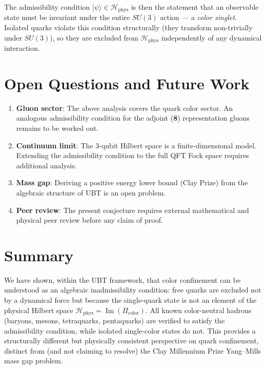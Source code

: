 \documentclass[12pt,a4paper]{article}
\newcommand{\Hphys}{\mathcal{H}_{\mathrm{phys}}}
\newcommand{\Picolor}{\Pi_{\mathrm{color}}}
\newcommand{\ket}[1]{|#1\rangle}
\begin{document}
The admissibility condition $\ket{\psi} \in \Hphys$ is then the statement that
an observable state must be invariant under the entire $SU(3)$ action — a
\emph{color singlet}.  Isolated quarks violate this condition structurally
(they transform non-trivially under $SU(3)$), so they are excluded from
$\Hphys$ independently of any dynamical interaction.

\section{Open Questions and Future Work}
\label{sec:open}

\begin{enumerate}
  \item \textbf{Gluon sector}: The above analysis covers the quark color sector.
    An analogous admissibility condition for the adjoint ($\mathbf{8}$)
    representation gluons remains to be worked out.
  \item \textbf{Continuum limit}: The 3-qubit Hilbert space is a finite-dimensional
    model.  Extending the admissibility condition to the full QFT Fock space
    requires additional analysis.
  \item \textbf{Mass gap}: Deriving a positive energy lower bound (Clay Prize) from
    the algebraic structure of UBT is an open problem.
  \item \textbf{Peer review}: The present conjecture requires external mathematical
    and physical peer review before any claim of proof.
\end{enumerate}

\section*{Summary}

We have shown, within the UBT framework, that color confinement can be
understood as an algebraic inadmissibility condition: free quarks are excluded
not by a dynamical force but because the single-quark state is not an element of
the physical Hilbert space $\Hphys = \operatorname{Im}(\Picolor)$.  All known
color-neutral hadrons (baryons, mesons, tetraquarks, pentaquarks) are verified
to satisfy the admissibility condition, while isolated single-color states do not.
This provides a structurally different but physically consistent perspective on
quark confinement, distinct from (and not claiming to resolve) the Clay Millennium
Prize Yang--Mills mass gap problem.
\end{document}
